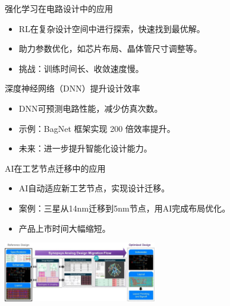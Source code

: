 \documentclass[xcolor=table,dvipsnames,svgnames,aspectratio=169]{ctexbeamer}
\begin{document}
\begin{frame}{强化学习在电路设计中的应用}
  \begin{itemize}
      \item RL在复杂设计空间中进行探索，快速找到最优解。
      \item 助力参数优化，如芯片布局、晶体管尺寸调整等。
      \item 挑战：训练时间长、收敛速度慢。
  \end{itemize}
  \begin{center}
  \end{center}
\end{frame}

\begin{frame}{深度神经网络（DNN）提升设计效率}
  \begin{itemize}
      \item DNN可预测电路性能，减少仿真次数。
      \item 示例：BagNet 框架实现 200 倍效率提升。
      \item 未来：进一步提升智能化设计能力。
  \end{itemize}
  \begin{center}
  \end{center}
\end{frame}

\begin{frame}{AI在工艺节点迁移中的应用}
  \begin{itemize}
      \item AI自动适应新工艺节点，实现设计迁移。
      \item 案例：三星从14nm迁移到5nm节点，用AI完成布局优化。
      \item 产品上市时间大幅缩短。
  \end{itemize}
  \begin{center}
      \includegraphics[width=0.5\textwidth]{figure-2-3-analog-design-migration-flow.jpg} 
  \end{center}
\end{frame}
\end{document}
